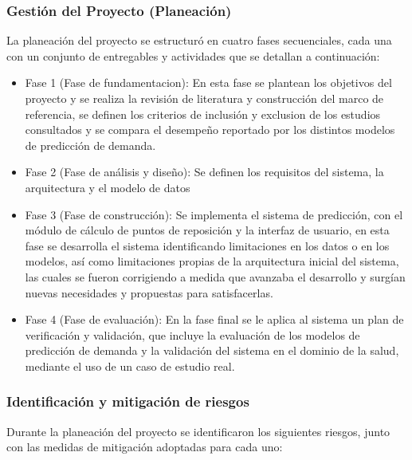 \subsubsection{Gestión del Proyecto (Planeación)}

La planeación del proyecto se estructuró en cuatro fases secuenciales, cada una con un conjunto de entregables y actividades que se detallan a continuación:

\begin{itemize}
    \item Fase 1 (Fase de fundamentacion): En esta fase se plantean los objetivos del proyecto y se realiza la revisión de literatura y construcción del marco de referencia, se definen los criterios de inclusión y exclusion de los estudios consultados y se compara el desempeño reportado por los distintos modelos de predicción de demanda.
    \item Fase 2 (Fase de análisis y diseño): Se definen los requisitos del sistema, la arquitectura y el modelo de datos
    \item Fase 3 (Fase de construcción): Se implementa el sistema de predicción, con el módulo de cálculo de puntos de reposición y la interfaz de usuario, en esta fase se desarrolla el sistema identificando limitaciones en los datos o en los modelos, así como limitaciones propias de la arquitectura inicial del sistema, las cuales se fueron corrigiendo a medida que avanzaba el desarrollo y surgían nuevas necesidades y propuestas para satisfacerlas.
    \item Fase 4 (Fase de evaluación): En la fase final se le aplica al sistema un plan de verificación y validación, que incluye la evaluación de los modelos de predicción de demanda y la validación del sistema en el dominio de la salud, mediante el uso de un caso de estudio real.
\end{itemize}

\subsubsection{Identificación y mitigación de riesgos}

Durante la planeación del proyecto se identificaron los siguientes riesgos, junto con las medidas de mitigación adoptadas para cada uno:

